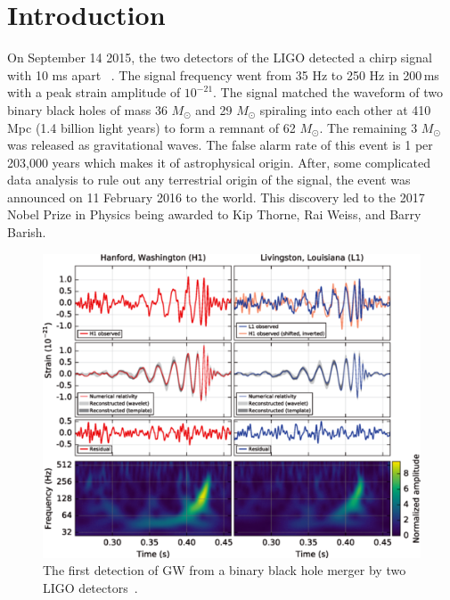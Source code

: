 \documentclass{ttuthes2007}
\begin{document}
\chapter{\textbf{Introduction}}
    On September 14 2015, the two detectors of the \ac{LIGO} detected a chirp
signal with 10 ms apart ~\cite{Abbott_2016}. The signal frequency went from 35
Hz to 250 Hz in 200\,ms with a peak strain amplitude of $10^{-21}$.  The signal
matched the waveform of two binary black holes of mass 36 $M_\odot$ and 29
$M_\odot$ spiraling into each other at 410\,Mpc (1.4 billion light years) to
form a remnant of 62 $M_\odot$. The remaining 3 $M_\odot$ was released as
gravitational waves.  The false alarm rate of this event is 1 per 203,000 years
which makes it of astrophysical origin.  After, some complicated data analysis
to rule out any terrestrial origin of the signal, the event was announced on 11
February 2016 to the world. This discovery led to the 2017 Nobel Prize in
Physics being awarded to Kip Thorne, Rai Weiss, and Barry Barish.
\begin{figure}[bht!]                                                              
        \includegraphics[width=\textwidth]{figure/BBH.png}                          
	\caption{The first detection of \ac{GW} from a binary black hole
merger by two \ac{LIGO} detectors~\cite{Abbott_2016}.}
\end{figure}      
\end{document}
